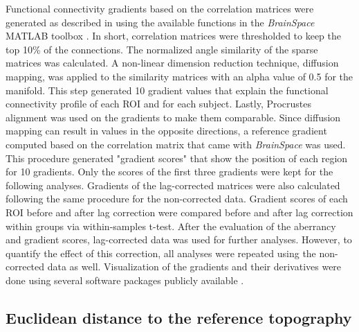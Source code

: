 \documentclass[fleqn,10pt]{wlscirep}
\begin{document}
Functional connectivity gradients based on the correlation matrices were generated as described in \citet{margulies2016situating} using the available functions in the \emph{BrainSpace} MATLAB toolbox \citep{vos2020brainspace}. In short, correlation matrices were thresholded to keep the top 10\% of the connections. The normalized angle similarity of the sparse matrices was calculated. A non-linear dimension reduction technique, diffusion mapping, was applied to the similarity matrices with an alpha value of 0.5 for the manifold. This step generated 10 gradient values that explain the functional connectivity profile of each ROI and for each subject. Lastly, Procrustes alignment was used on the gradients to make them comparable. Since diffusion mapping can result in values in the opposite directions, a reference gradient computed based on the correlation matrix that came with \emph{BrainSpace} was used. This procedure generated "gradient scores" that show the position of each region for 10 gradients. Only the scores of the first three gradients were kept for the following analyses.
Gradients of the lag-corrected matrices were also calculated following the same procedure for the non-corrected data.  Gradient scores of each ROI before and after lag correction were compared before and after lag correction within groups via within-samples t-test. After the evaluation of the aberrancy and gradient scores,  lag-corrected data was used for further analyses. However, to quantify the effect of this correction, all analyses were repeated using the non-corrected data as well. 
\color{blue}Visualization of the gradients and their derivatives were done using several software packages publicly available \citep{vos2020brainspace,worsley2009matlab,gale2021surfplot,bayrakgithub}. \color{black}


\subsection*{Euclidean distance to the reference topography}
\end{document}
